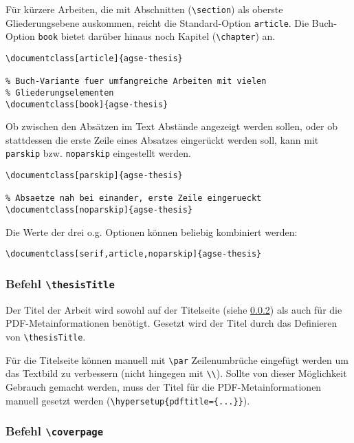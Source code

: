 Für kürzere Arbeiten, die mit Abschnitten (\texttt{\textbackslash{}section})
als oberste Gliederungsebene auskommen, reicht die Standard-Option
\texttt{article}.
Die Buch-Option \texttt{book} bietet darüber hinaus noch Kapitel
(\texttt{\textbackslash{}chapter}) an.
\begin{lstlisting}[language={[LaTeX]TeX}]
% Standard fuer kuerzere Arbeiten
\documentclass[article]{agse-thesis}

% Buch-Variante fuer umfangreiche Arbeiten mit vielen
% Gliederungselementen
\documentclass[book]{agse-thesis}
\end{lstlisting}

Ob zwischen den Absätzen im Text Abstände angezeigt werden sollen, oder ob
stattdessen die erste Zeile eines Absatzes eingerückt werden soll, kann mit
\texttt{parskip} bzw. \texttt{noparskip} eingestellt werden.
\begin{lstlisting}[language={[LaTeX]TeX}]
% Absaetze deutlich trennen
\documentclass[parskip]{agse-thesis}

% Absaetze nah bei einander, erste Zeile eingerueckt
\documentclass[noparskip]{agse-thesis}
\end{lstlisting}

Die Werte der drei o.g. Optionen können beliebig kombiniert werden:
\begin{lstlisting}[language={[LaTeX]TeX}]
% Einstellung des Beispieldokuments
\documentclass[serif,article,noparskip]{agse-thesis}
\end{lstlisting}

\subsubsection{Befehl \texttt{\textbackslash{}thesisTitle}}

Der Titel der Arbeit wird sowohl auf der Titelseite (siehe
\ref{sec:cmd-coverpage}) als auch für die PDF-Metainformationen benötigt.
Gesetzt wird der Titel durch das Definieren von
\texttt{\textbackslash{}thesisTitle}.

Für die Titelseite können manuell mit \texttt{\textbackslash{}par}
Zeilenumbrüche eingefügt werden um das Textbild zu verbessern (nicht hingegen
mit \texttt{\textbackslash\textbackslash}).
Sollte von dieser Möglichkeit Gebrauch gemacht werden, muss der Titel für die
PDF-Metainformationen manuell gesetzt werden
(\texttt{\textbackslash{}hypersetup\{pdftitle=\{...\}\}}).


\subsubsection{Befehl \texttt{\textbackslash{}coverpage}}
\label{sec:cmd-coverpage}

